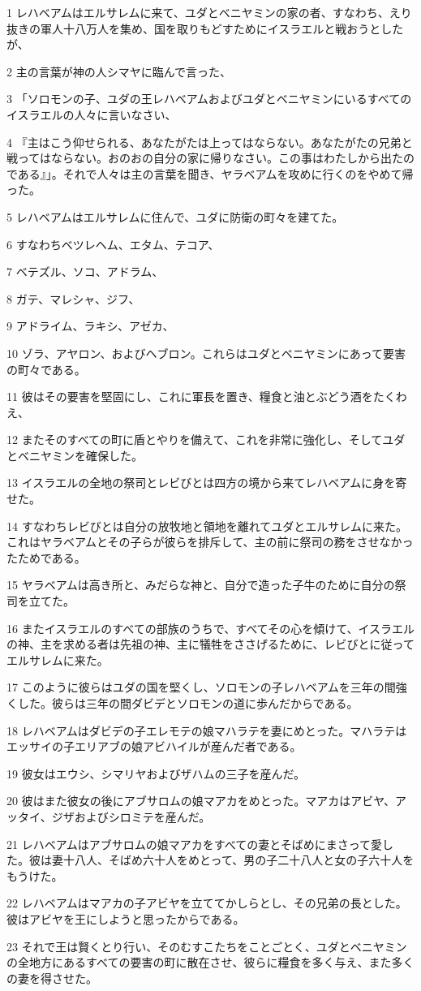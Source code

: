 \par 1 レハベアムはエルサレムに来て、ユダとベニヤミンの家の者、すなわち、えり抜きの軍人十八万人を集め、国を取りもどすためにイスラエルと戦おうとしたが、
\par 2 主の言葉が神の人シマヤに臨んで言った、
\par 3 「ソロモンの子、ユダの王レハベアムおよびユダとベニヤミンにいるすべてのイスラエルの人々に言いなさい、
\par 4 『主はこう仰せられる、あなたがたは上ってはならない。あなたがたの兄弟と戦ってはならない。おのおの自分の家に帰りなさい。この事はわたしから出たのである』」。それで人々は主の言葉を聞き、ヤラベアムを攻めに行くのをやめて帰った。
\par 5 レハベアムはエルサレムに住んで、ユダに防衛の町々を建てた。
\par 6 すなわちベツレヘム、エタム、テコア、
\par 7 ベテズル、ソコ、アドラム、
\par 8 ガテ、マレシャ、ジフ、
\par 9 アドライム、ラキシ、アゼカ、
\par 10 ゾラ、アヤロン、およびヘブロン。これらはユダとベニヤミンにあって要害の町々である。
\par 11 彼はその要害を堅固にし、これに軍長を置き、糧食と油とぶどう酒をたくわえ、
\par 12 またそのすべての町に盾とやりを備えて、これを非常に強化し、そしてユダとベニヤミンを確保した。
\par 13 イスラエルの全地の祭司とレビびとは四方の境から来てレハベアムに身を寄せた。
\par 14 すなわちレビびとは自分の放牧地と領地を離れてユダとエルサレムに来た。これはヤラベアムとその子らが彼らを排斥して、主の前に祭司の務をさせなかったためである。
\par 15 ヤラベアムは高き所と、みだらな神と、自分で造った子牛のために自分の祭司を立てた。
\par 16 またイスラエルのすべての部族のうちで、すべてその心を傾けて、イスラエルの神、主を求める者は先祖の神、主に犠牲をささげるために、レビびとに従ってエルサレムに来た。
\par 17 このように彼らはユダの国を堅くし、ソロモンの子レハベアムを三年の間強くした。彼らは三年の間ダビデとソロモンの道に歩んだからである。
\par 18 レハベアムはダビデの子エレモテの娘マハラテを妻にめとった。マハラテはエッサイの子エリアブの娘アビハイルが産んだ者である。
\par 19 彼女はエウシ、シマリヤおよびザハムの三子を産んだ。
\par 20 彼はまた彼女の後にアブサロムの娘マアカをめとった。マアカはアビヤ、アッタイ、ジザおよびシロミテを産んだ。
\par 21 レハベアムはアブサロムの娘マアカをすべての妻とそばめにまさって愛した。彼は妻十八人、そばめ六十人をめとって、男の子二十八人と女の子六十人をもうけた。
\par 22 レハベアムはマアカの子アビヤを立ててかしらとし、その兄弟の長とした。彼はアビヤを王にしようと思ったからである。
\par 23 それで王は賢くとり行い、そのむすこたちをことごとく、ユダとベニヤミンの全地方にあるすべての要害の町に散在させ、彼らに糧食を多く与え、また多くの妻を得させた。

